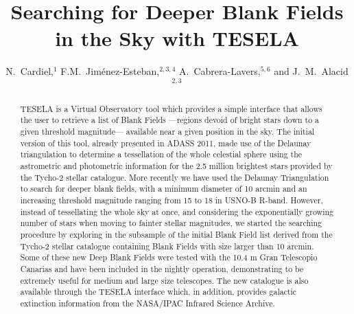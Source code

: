 
\resetcounters





\title{Searching for Deeper Blank Fields in the Sky with TESELA}
\author{N.~Cardiel,$^1$ F.M.~Jim\'{e}nez-Esteban,$^{2,3,4}$
A.~Cabrera-Lavers,$^{5,6}$ and J.~M.~Alacid$^{2,3}$
}


\begin{abstract}
TESELA is a Virtual Observatory tool which provides a simple interface that allows the user to retrieve a list of Blank Fields ---regions devoid of bright stars down to a given threshold magnitude--- available near a given position in the sky. The initial version of this tool, already presented in ADASS 2011, made use of the Delaunay triangulation to determine a tessellation of the whole celestial sphere using the astrometric and photometric information for the 2.5 million brightest stars provided by the Tycho-2 stellar catalogue. More recently we have used the Delaunay Triangulation to search for deeper blank fields, with a minimum diameter of 10 arcmin and an increasing threshold
magnitude ranging from 15 to 18 in USNO-B R-band. However, instead of tessellating the whole sky at once, and considering the exponentially growing number of stars when moving to fainter stellar magnitudes, we started the searching procedure by exploring in the subsample of the initial Blank Field list derived from the Tycho-2 stellar catalogue containing Blank Fields with size larger than 10 arcmin. Some of these new Deep Blank Fields were tested with the 10.4 m Gran Telescopio Canarias and have been included in the nightly operation, demonstrating to be extremely useful for medium and large size telescopes. The new catalogue is also available through the TESELA interface which, in addition, provides galactic extinction information from the NASA/IPAC Infrared Science Archive. 
\end{abstract}

